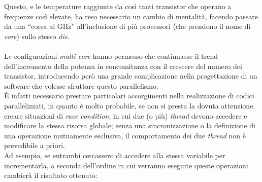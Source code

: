 Questo, e le temperature raggiunte da così tanti transistor che operano a 
frequenze così elevate, ha reso necessario un cambio di mentalità, facendo 
passare da una ``corsa al GHz'' all'inclusione di più processori (che 
prendono il nome di \emph{core}) sullo stesso \emph{die}. 
\\ \\
Le configurazioni \emph{multi core} hanno permesso che continuasse il 
trend %
 dell'incremento della potenza in concomitanza con il crescere 
del numero dei transistor, introducendo però una grande complicazione nella 
progettazione di un software che volesse sfruttare questo parallelismo. \\
È infatti necessario prestare particolari accorgimenti nella realizzazione 
di codici parallelizzati, in quanto è molto probabile, se non si presta la 
dovuta attenzione, creare situazioni di \emph{race condition}, in cui due (o 
più) \emph{thread} devono accedere e modificare la stessa risorsa globale; 
senza una sincronizzazione o la definizione di una operazione mutuamente 
esclusiva, il comportamento dei due \emph{thread} non è prevedibile a priori. \\
Ad esempio, se entrambi cercassero di accedere alla stessa variabile per 
incrementarla, a seconda dell'ordine in cui verranno eseguite queste operazioni 
cambierà il risultato ottenuto:
